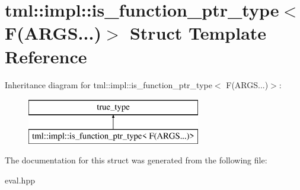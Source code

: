\hypertarget{structtml_1_1impl_1_1is__function__ptr__type_3_01F_07ARGS_8_8_8_08_4}{\section{tml\+:\+:impl\+:\+:is\+\_\+function\+\_\+ptr\+\_\+type$<$ F(A\+R\+G\+S...)$>$ Struct Template Reference}
\label{structtml_1_1impl_1_1is__function__ptr__type_3_01F_07ARGS_8_8_8_08_4}
}
Inheritance diagram for tml\+:\+:impl\+:\+:is\+\_\+function\+\_\+ptr\+\_\+type$<$ F(A\+R\+G\+S...)$>$\+:\begin{figure}[H]
\begin{center}
\leavevmode
\includegraphics[height=2.000000cm]{structtml_1_1impl_1_1is__function__ptr__type_3_01F_07ARGS_8_8_8_08_4}
\end{center}
\end{figure}


The documentation for this struct was generated from the following file\+:\begin{DoxyCompactItemize}
\item 
eval.\+hpp\end{DoxyCompactItemize}
